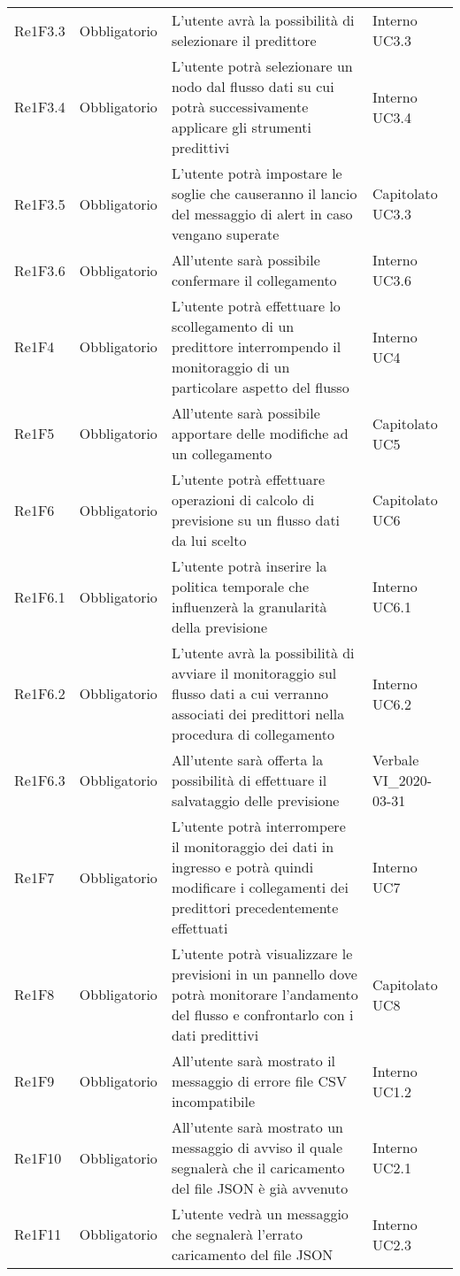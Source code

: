 \begin{longtable}{C{3cm} C{3cm} L{5.5cm} C{3cm}}
Re1F3.3 & Obbligatorio & L’utente avrà la possibilità di selezionare il predittore  &  Interno UC3.3\\
Re1F3.4 & Obbligatorio & L’utente potrà selezionare un nodo dal flusso dati su cui potrà successivamente applicare gli strumenti predittivi &  Interno UC3.4\\
Re1F3.5 & Obbligatorio & L’utente potrà impostare le soglie che causeranno il lancio del messaggio di alert in caso vengano superate &  Capitolato UC3.3\\
Re1F3.6 & Obbligatorio & All’utente sarà possibile confermare il collegamento &  Interno UC3.6\\
Re1F4 & Obbligatorio & L’utente potrà effettuare lo scollegamento di un predittore interrompendo il monitoraggio di un particolare aspetto del flusso &  Interno UC4\\
Re1F5 & Obbligatorio & All’utente sarà possibile apportare delle modifiche ad un collegamento & Capitolato UC5\\
Re1F6 & Obbligatorio & L’utente potrà effettuare operazioni di calcolo di previsione su un flusso dati da lui scelto &  Capitolato UC6\\
Re1F6.1 & Obbligatorio & L’utente potrà inserire la politica temporale che influenzerà la granularità della previsione &  Interno UC6.1\\
Re1F6.2 & Obbligatorio & L’utente avrà la possibilità di avviare il monitoraggio sul flusso dati a cui verranno associati dei predittori nella procedura di collegamento &  Interno UC6.2\\
Re1F6.3 & Obbligatorio & All’utente sarà offerta la possibilità di effettuare il salvataggio delle previsione &  Verbale VI\_2020-03-31\\
Re1F7 & Obbligatorio & L’utente potrà interrompere il monitoraggio dei dati in ingresso e potrà quindi modificare i collegamenti dei predittori precedentemente effettuati & Interno UC7\\
Re1F8 & Obbligatorio & L’utente potrà visualizzare le previsioni in un pannello dove potrà monitorare l'andamento del flusso e confrontarlo con i dati predittivi&  Capitolato UC8\\
Re1F9 & Obbligatorio & All’utente sarà mostrato il messaggio di errore file CSV incompatibile &  Interno UC1.2\\
Re1F10 & Obbligatorio & All’utente sarà mostrato un messaggio di avviso il quale segnalerà che il caricamento del file JSON è già avvenuto &  Interno UC2.1\\
Re1F11 & Obbligatorio & L’utente vedrà un messaggio che segnalerà l’errato caricamento del file JSON &  Interno UC2.3\\

\end{longtable}
